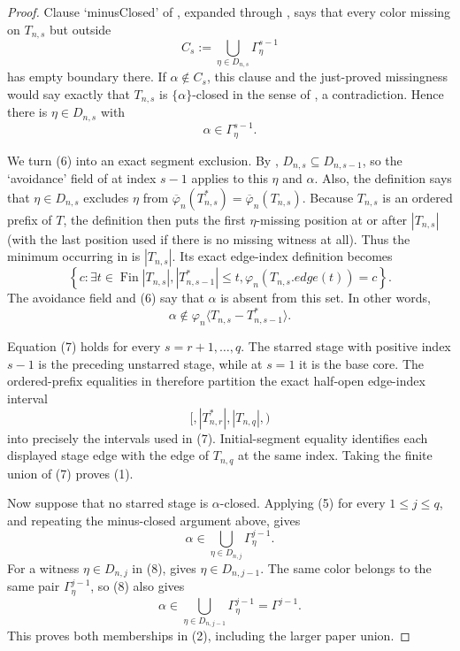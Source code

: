 \begin{proof}
Clause `minusClosed' of , expanded through
, says that every color missing on
$T_{n,s}$ but outside
\[
                   C_s:=\bigcup_{\eta\in D_{n,s}}
                                  \Gamma^{s-1}_{\eta}
\]
has empty boundary there.  If $\alpha\notin C_s$, this clause and the
just-proved missingness would say exactly that $T_{n,s}$ is
$\{\alpha\}$-closed in the sense of
, a contradiction.  Hence there is
$\eta\in D_{n,s}$ with
\[
                         \alpha\in\Gamma^{s-1}_{\eta}.          \tag{6}
\]

We turn (6) into an exact segment exclusion.  By
,
$D_{n,s}\subseteq D_{n,s-1}$, so the `avoidance' field of
 at index $s-1$ applies to this $\eta$ and
$\alpha$.  Also, the definition
 says that
$\eta\in D_{n,s}$ excludes $\eta$ from
$\overline\varphi_n(T_{n,s}^{*})=
  \overline\varphi_n(T_{n,s})$.
Because $T_{n,s}$ is an ordered prefix of $T$, the definition
 then puts the first
$\eta$-missing position at or after $|T_{n,s}|$ (with the last position
used if there is no missing witness at all).  Thus the minimum occurring
in  is $|T_{n,s}|$.  Its exact
edge-index definition becomes
\[
 \left\{c:\exists t\in\operatorname{Fin}|T_{n,s}|,
   |T_{n,s-1}^{*}|\leq t,
   \varphi_n(T_{n,s}.\mathit{edge}(t))=c\right\}.
\]
The avoidance field and (6) say that $\alpha$ is absent from this set.
In other words,
\[
 \alpha\notin
 \varphi_n\langle T_{n,s}-T_{n,s-1}^{*}\rangle.               \tag{7}
\]

Equation (7) holds for every $s=r+1,\ldots,q$.  The starred stage with
positive index $s-1$ is the preceding unstarred stage, while at
$s=1$ it is the base core.  The ordered-prefix equalities in
 therefore partition the exact half-open
edge-index interval
\[
              [,|T_{n,r}^{*}|,|T_{n,q}|,)
\]
into precisely the intervals used in (7).  Initial-segment equality
identifies each displayed stage edge with the edge of $T_{n,q}$ at the
same index.  Taking the finite union of (7) proves (1).

Now suppose that no starred stage is $\alpha$-closed.  Applying (5) for
every $1\leq j\leq q$, and repeating the minus-closed argument above,
gives
\[
        \alpha\in\bigcup_{\eta\in D_{n,j}}
                            \Gamma^{j-1}_{\eta}.                \tag{8}
\]
For a witness $\eta\in D_{n,j}$ in (8),
 gives
$\eta\in D_{n,j-1}$.  The same color belongs to the same pair
$\Gamma^{j-1}_{\eta}$, so (8) also gives
\[
        \alpha\in\bigcup_{\eta\in D_{n,j-1}}
                            \Gamma^{j-1}_{\eta}=\Gamma^{j-1}.
\]
This proves both memberships in (2), including the larger paper union.


\end{proof}
